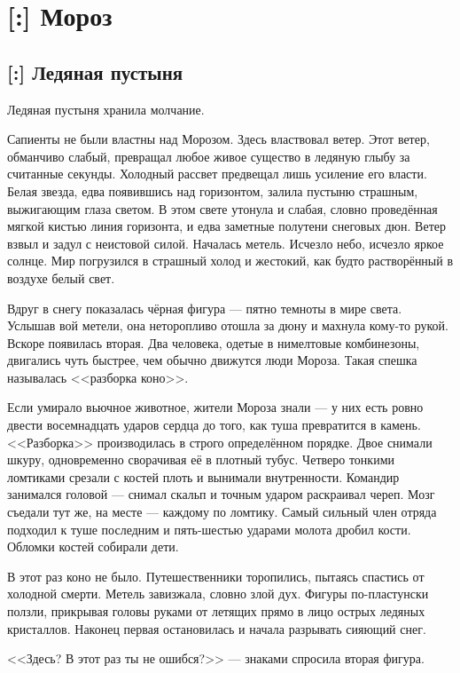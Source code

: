 \chapter{[:] Мороз}

\section{[:] Ледяная пустыня}

Ледяная пустыня хранила молчание.

Сапиенты не были властны над Морозом.
Здесь властвовал ветер.
Этот ветер, обманчиво слабый, превращал любое живое существо в ледяную глыбу за считанные секунды.
Холодный рассвет предвещал лишь усиление его власти.
Белая звезда, едва появившись над горизонтом, залила пустыню страшным, выжигающим глаза светом.
В этом свете утонула и слабая, словно проведённая мягкой кистью линия горизонта, и едва заметные полутени снеговых дюн.
Ветер взвыл и задул с неистовой силой.
Началась метель.
Исчезло небо, исчезло яркое солнце.
Мир погрузился в страшный холод и жестокий, как будто растворённый в воздухе белый свет.

Вдруг в снегу показалась чёрная фигура --- пятно темноты в мире света.
Услышав вой метели, она неторопливо отошла за дюну и махнула кому-то рукой.
Вскоре появилась вторая.
Два человека, одетые в нимелтовые комбинезоны, двигались чуть быстрее, чем обычно движутся люди Мороза.
Такая спешка называлась <<разборка коно>>.

Если умирало вьючное животное, жители Мороза знали --- у них есть ровно двести восемнадцать ударов сердца до того, как туша превратится в камень.
<<Разборка>> производилась в строго определённом порядке.
Двое снимали шкуру, одновременно сворачивая её в плотный тубус.
Четверо тонкими ломтиками срезали с костей плоть и вынимали внутренности.
Командир занимался головой --- снимал скальп и точным ударом раскраивал череп.
Мозг съедали тут же, на месте --- каждому по ломтику.
Самый сильный член отряда подходил к туше последним и пять-шестью ударами молота дробил кости.
Обломки костей собирали дети.

В этот раз коно не было.
Путешественники торопились, пытаясь спастись от холодной смерти.
Метель завизжала, словно злой дух.
Фигуры по-пластунски ползли, прикрывая головы руками от летящих прямо в лицо острых ледяных кристаллов.
Наконец первая остановилась и начала разрывать сияющий снег.

<<Здесь? В этот раз ты не ошибся?>> --- знаками спросила вторая фигура.

